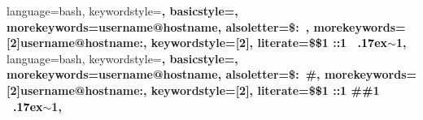 \usepackage[french]{babel}
\usepackage[utf8]{inputenc}
\usepackage[T1]{fontenc}
\usepackage{subfiles}
\usepackage{amssymb,amsmath,amsfonts,amsthm}%
\usepackage{empheq}
\usepackage{bigints}
\usepackage{pdfpages}
\usepackage[top=2.5cm, bottom=2.5cm, left=2.5cm, right=2.5cm]{geometry}
\usepackage{fancyhdr}
\usepackage{textcomp}
\usepackage{etoolbox}
\usepackage{xcolor}
\usepackage{url}
\usepackage{placeins}
\usepackage{lastpage}
\usepackage{tikz}
\usepackage{draftwatermark}
\usetikzlibrary{intersections,shapes,arrows,calc,positioning,patterns,decorations.pathmorphing,decorations.markings,matrix,snakes}
\usepackage[european,cuteinductors]{circuitikz}
\usepackage{listings}



{language=bash,
 keywordstyle=\bf\color{black},
 basicstyle=\ttfamily,
 morekeywords={username@hostname},
 alsoletter={\$:~},
 morekeywords=[2]{username@hostname:},
 keywordstyle=[2]{\color{black}},
 literate={\$}{{\textcolor{black}{\$}}}1
 {:}{{\textcolor{black}{:}}}1
 {~}{{\textcolor{black}{{\raise.17ex\hbox{$\scriptstyle\sim$}}}}}1,
}
{language=bash,
 keywordstyle=\bf\color{black},
 basicstyle=\footnotesize \ttfamily,
 morekeywords={username@hostname},
 alsoletter={\$:~\#},
 morekeywords=[2]{username@hostname:},
 keywordstyle=[2]{\color{black}},
 literate={\$}{{\textcolor{black}{\$}}}1
 {:}{{\textcolor{black}{:}}}1
 {\#}{{\textcolor{black}{\#}}}1
 {~}{{\textcolor{black}{{\raise.17ex\hbox{$\scriptstyle\sim$}}}}}1,
}


\newcommand{\headrulecolor}[1]{\patchcmd{\headrule}{\hrule}{\color{#1}\hrule}{}{}}
\newcommand{\footrulecolor}[1]{\patchcmd{\footrule}{\hrule}{\color{#1}\hrule}{}{}}
\renewcommand{\headrulewidth}{1pt}
\renewcommand{\footrulewidth}{1pt}
\headrulecolor{redisen}
\footrulecolor{redisen}


\pagestyle{fancy}
\lhead{\textcolor{grayisen1}{\longtitle}}
\chead{}
\makeatletter
\rhead{\textcolor{grayisen1}{\shorttitle}}
\makeatother
\lfoot{\textcolor{grayisen1}{\laclasse}}
\rfoot{\textcolor{grayisen1}{\ecole}}

